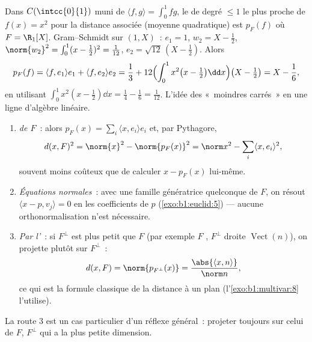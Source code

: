 \begin{example}\label{ex:b1:euclid:bestapprox}
Dans $C(\intcc{0}{1})$ muni de $\langle f, g\rangle = \int_0^1 fg$,
le  de degré $\leq 1$ le plus proche de $f(x) = x^2$ pour
la distance associée (moyenne quadratique) est $p_F(f)$ où $F = \R_1[X]$.
Gram--Schmidt sur $(1, X)$~: $e_1 = 1$, $w_2 = X - \frac12$,
$\norm{w_2}^2 = \int_0^1 (x - \frac12)^2 = \frac{1}{12}$, $e_2 =
\sqrt{12}\,(X - \tfrac12)$. Alors
\[
p_F(f) = \langle f, e_1\rangle e_1 + \langle f, e_2\rangle e_2
= \frac13 + 12\Bigl(\int_0^1 x^2\bigl(x - \tfrac12\bigr)\dd
x\Bigr)\bigl(X - \tfrac12\bigr)
= X - \frac{1}{6},
\]
en utilisant $\int_0^1 x^2(x - \frac12)\dd x = \frac14 - \frac16 =
\frac{1}{12}$. L'idée des «~moindres carrés~» en une ligne
d'algèbre linéaire.
\end{example}

\begin{method}
\label{met:b1:euclid:distance}
\begin{enumerate}
  \item \emph{  de $F$}~: alors $p_F(x) = \sum_i
        \langle x, e_i\rangle e_i$ et, par Pythagore,
        \[
        d(x, F)^2 = \norm{x}^2 - \norm{p_F(x)}^2
        = \norm x^2 - \sum_i \langle x, e_i\rangle^2 ,
        \]
        souvent moins coûteux que de calculer $x - p_F(x)$
        lui-même.
  \item \emph{Équations normales}~: avec une famille génératrice
        quelconque de $F$, on résout $\langle x - p, v_j\rangle =
        0$ en les coefficients de $p$ (\cref{exo:b1:euclid:5}) ---
        aucune orthonormalisation n'est nécessaire.
  \item \emph{Par l'}~: si $F^\perp$ est plus petit
        que $F$ (par exemple $F$ , $F^\perp$ droite
        $\operatorname{Vect}(n)$), on projette plutôt sur
        $F^\perp$~:
        \[
        d(x, F) = \norm{p_{F^\perp}(x)} =
        \frac{\abs{\langle x, n\rangle}}{\norm n} ,
        \]
        ce qui est la formule classique de la distance à un plan
        (l'\cref{exo:b1:multivar:8} l'utilise).
\end{enumerate}
La route 3 est un cas particulier d'un réflexe général~: projeter
toujours sur celui de $F$, $F^\perp$ qui a la plus petite dimension.
\end{method}

